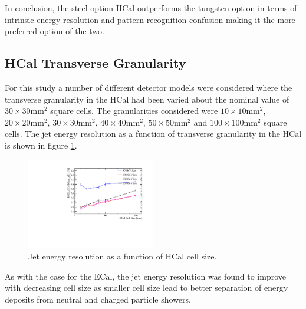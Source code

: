 In conclusion, the steel option HCal outperforms the tungsten option in terms of intrinsic energy resolution and pattern recognition confusion making it the more preferred option of the two.


\subsection{HCal Transverse Granularity}
\label{sec:hcalcells}
For this study a number of different detector models were considered where the transverse granularity in the HCal had been varied about the nominal value of $30 \times 30 \text{mm}^{2}$ square cells.  The granularities considered were $10 \times 10 \text{mm}^{2}$, $20 \times 20 \text{mm}^{2}$, $30 \times 30 \text{mm}^{2}$, $40 \times 40 \text{mm}^{2}$, $50 \times 50 \text{mm}^{2}$ and $100 \times 100 \text{mm}^{2}$ square cells.  The jet energy resolution as a function of transverse granularity in the HCal is shown in figure \ref{fig:hcalcellsize}.

\begin{figure}
\centering
\includegraphics[width=0.5\textwidth]{OptimisationStudies/Plots/JetEnergyResolutions/JER_vs_HCalCellSize.pdf}
\caption[Jet energy resolution as a function of HCal cell size.]{Jet energy resolution as a function of HCal cell size.}
\label{fig:hcalcellsize}
\end{figure}

As with the case for the ECal, the jet energy resolution was found to improve with decreasing cell size as smaller cell size lead to better separation of energy deposits from neutral and charged particle showers.

